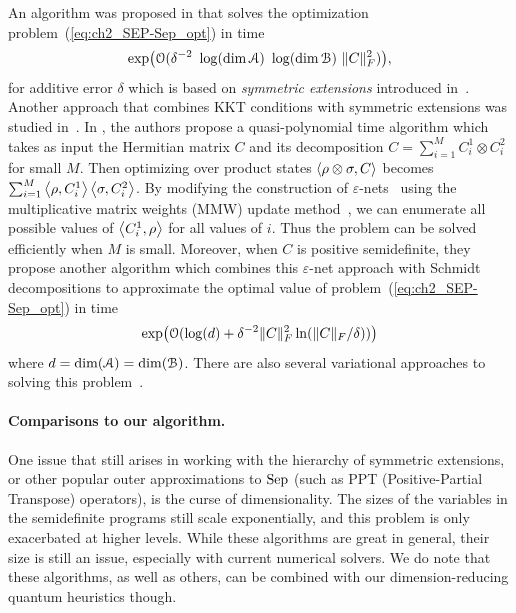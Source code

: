 An algorithm was proposed in \cite{brandao2011quasipolynomial} that solves the optimization problem~(\ref{eq:ch2_SEP-Sep_opt}) in time 
\begin{equation} 
\exp(\Ocomp(\delta^{-2}\ \log(\dim \A)\ \log(\dim \B)\ \| C \|_F^2)), 
\end{equation} 
for additive error $\delta$ which is based on \emph{symmetric extensions} introduced in~\cite{doherty2002SymExt}. 
Another approach that combines KKT conditions with symmetric extensions was studied in~\cite{harrow2017improved}. 
In \cite{shi2015epsilon}, the authors propose a quasi-polynomial time algorithm which takes as input the Hermitian matrix $C$ and its decomposition $C = \sum_{i=1}^M C_i^1 \otimes C_i^2$ for small $M$.
Then optimizing over product states $\left\langle \rho \otimes \sigma, C \right\rangle$ becomes $\sum_{i=1}^M \left\langle \rho, C_i^1 \right\rangle \left\langle \sigma, C_i^2 \right\rangle$. 
By modifying the construction of $\varepsilon$-nets~\cite[Definition 1]{shi2015epsilon} using the multiplicative matrix weights (MMW) update method~\cite{arora2012multiplicative}, we can enumerate all possible values of $\left\langle C_i^1, \rho \right\rangle$ for all values of $i$. 
Thus the problem can be solved efficiently when $M$ is small. 
Moreover, when $C$ is positive semidefinite, they propose another algorithm which combines this $\varepsilon$-net approach with Schmidt decompositions to approximate the optimal value of problem~(\ref{eq:ch2_SEP-Sep_opt})  
in time 
\begin{equation} 
\exp(\mathcal{O}(\log(d) + \delta^{-2} \|C\|_F^2 \ln(\|C\|_F/\delta)))  
\end{equation} 
where $d = \dim(\mathcal{A}) = \dim(\mathcal{B})$.  
There are also several variational approaches to solving this problem~\cite{consiglio2022variational, philip2024schrodinger}. 

\paragraph{Comparisons to our algorithm.} 
One issue that still arises in working with the hierarchy of symmetric extensions, or other popular outer approximations to $\mathrm{Sep}$ (such as PPT (Positive-Partial Transpose) operators), is the curse of dimensionality. 
The sizes of the variables in the semidefinite programs still scale exponentially, and this problem is only exacerbated at higher levels. 
While these algorithms are great in general, their size is still an issue, especially with current numerical solvers.  
We do note that these algorithms, as well as others, can be combined with our dimension-reducing quantum heuristics though. 

